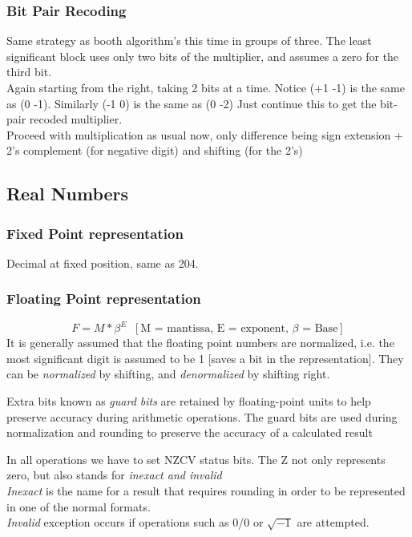 \documentclass[10pt]{article}
\begin{document}
\subsubsection{Bit Pair Recoding}
Same strategy as booth algorithm's this time in groups of three. The least significant block uses only two bits of the multiplier, and assumes a zero for the third bit.\\
Again starting from the right, taking 2 bits at a time. Notice (+1 -1) is the same as (0 -1). Similarly (-1 0) is the same as (0 -2)
Just continue this to get the bit-pair recoded multiplier.\\
Proceed with multiplication as usual now, only difference being sign extension + 2's complement (for negative digit)  and shifting (for the 2's)
\newpage
\subsection{Real Numbers}
\subsubsection{Fixed Point representation}
Decimal at fixed position, same as 204.
\subsubsection{Floating Point representation}
$$F = M * \beta^E\;\;[\text{M = mantissa, E = exponent, $\beta$ = Base}]$$
It is generally assumed that the floating point numbers are normalized, i.e. the most significant digit is assumed to be 1 [saves a bit in the representation]. They can be \textit{normalized} by shifting, and \textit{denormalized} by shifting right.

Extra bits known as \textit{guard bits} are retained by floating-point
units to help preserve accuracy during arithmetic operations. The guard bits are used during normalization and rounding to preserve
the accuracy of a calculated result

In all operations we have to set NZCV status bits. The Z not only represents zero, but also stands for \textit{inexact and invalid}\\
\textit{Inexact} is the name for a result that requires rounding in order to be represented in one of the normal formats.\\
\textit{Invalid} exception occurs if operations such as 0/0 or $\sqrt{-1}$ are attempted.\\
\end{document}

